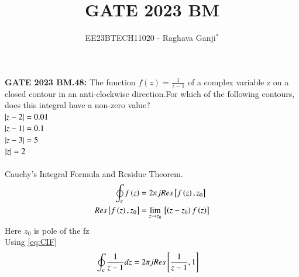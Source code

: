 \documentclass[journal,12pt,twocolumn]{IEEEtran}
\theoremstyle{remark}
\begin{document}

\vspace{3cm}

\title{GATE 2023 BM}
\author{EE23BTECH11020 - Raghava Ganji$^{*}$%
}
\maketitle
\newpage
\bigskip

\renewcommand{\thefigure}{\theenumi}
\renewcommand{\thetable}{\theenumi}

\textbf{GATE 2023 BM.48:}
The function $f(z)=\frac{1}{z-1}$ of a complex variable z on a closed contour in an anti-clockwise direction.For which of the following contours, does this integral have a non-zero value?\\
$\left\vert z-2\right\vert=0.01$\\
$\left\vert z-1\right\vert=0.1$\\
$\left\vert z-3\right\vert=5$\\
$\left\vert z\right\vert=2$\\
\solution\\
\fi
Cauchy's Integral Formula and Residue Theorem.
\begin{align}
\oint_{c}f\brak z&=2\pi jRes\sbrak{f\brak z,z_0}\label{eq:CIF}\\
Res\sbrak{f\brak z,z_0}&=\lim_{z\to z_0}\sbrak{\brak{z-z_0}f\brak z}\label{eq:Res Thm}
\end{align}
Here $z_0$ is pole of the f\brak z\\
Using \eqref{eq:CIF}
\begin{align}
\oint_{c}\frac{1}{z-1}dz &=2\pi jRes{}\left[\frac{1}{z-1},1\right]
\end{align}
\end{document}
